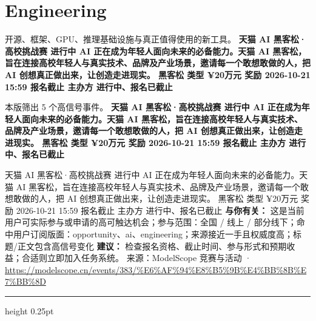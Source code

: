 \documentclass[10.5pt]{ctexart}
\begin{document}
\section*{Engineering}
{\color{ormuted} 开源、框架、GPU、推理基础设施与真正值得使用的新工具。}
\vspace{2mm}
{\LARGE\bfseries 天猫 AI 黑客松·高校挑战赛 进行中 AI 正在成为年轻人面向未来的必备能力。天猫 AI 黑客松，旨在连接高校年轻人与真实技术、品牌及产业场景，邀请每一个敢想敢做的人，把 AI 创想真正做出来，让创造走进现实。 黑客松 类型 ¥20万元 奖励 2026-10-21 15:59 报名截止 主办方 进行中、报名已截止}\par
\vspace{1mm}
{\color{ormuted} 本版筛出 5 个高信号事件。}
\vspace{3mm}
{\Large\bfseries 天猫 AI 黑客松·高校挑战赛 进行中 AI 正在成为年轻人面向未来的必备能力。天猫 AI 黑客松，旨在连接高校年轻人与真实技术、品牌及产业场景，邀请每一个敢想敢做的人，把 AI 创想真正做出来，让创造走进现实。 黑客松 类型 ¥20万元 奖励 2026-10-21 15:59 报名截止 主办方 进行中、报名已截止}\par
天猫 AI 黑客松·高校挑战赛 进行中 AI 正在成为年轻人面向未来的必备能力。天猫 AI 黑客松，旨在连接高校年轻人与真实技术、品牌及产业场景，邀请每一个敢想敢做的人，把 AI 创想真正做出来，让创造走进现实。 黑客松 类型 ¥20万元 奖励 2026-10-21 15:59 报名截止 主办方 进行中、报名已截止
\textbf{与你有关：} 这是当前用户可实际参与或申请的高可触达机会；参与范围：全国 / 线上 / 部分线下；命中用户订阅版面：opportunity、ai、engineering；来源接近一手且权威度高；标题/正文包含高信号变化
\textbf{建议：} 检查报名资格、截止时间、参与形式和预期收益；合适则立即加入任务系统。
{\footnotesize\color{ormuted} 来源：ModelScope 竞赛与活动 · \url{https://modelscope.cn/events/383/%E6%AF%94%E8%B5%9B%E4%BB%8B%E7%BB%8D}}
\vspace{4mm}
\hrule height 0.25pt
\vspace{3mm}
\end{document}
